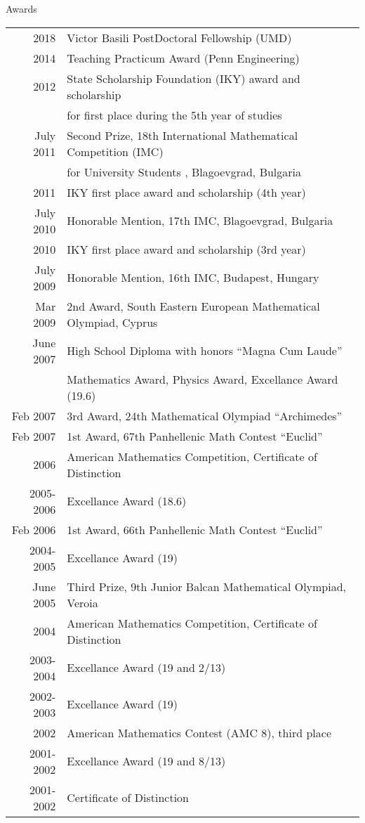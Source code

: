 \documentclass{resume} %
\begin{document}

\begin{rSection}{Awards}

  \begin{longtable}{rl}
  2018 & Victor Basili PostDoctoral Fellowship (UMD)\\
  2014	 & Teaching Practicum Award (Penn Engineering) \\
  2012 & State Scholarship Foundation (IKY) award and scholarship \\
       & for first place during the 5th year of studies \\
  July  2011  &  Second  Prize,  18th  International Mathematical Competition (IMC) \\
  &  for University Students , Blagoevgrad, Bulgaria \\
  2011 & IKY first place award and scholarship (4th year)\\
  July 2010 &  Honorable Mention,  17th IMC, Blagoevgrad, Bulgaria \\
  2010 & IKY first place award and scholarship (3rd year)\\
  July 2009 &  Honorable Mention,  16th IMC, Budapest, Hungary\\
  Mar 2009  &  2nd Award, South Eastern European Mathematical Olympiad, Cyprus\\

  June  2007 &   High  School  Diploma with  honors  “Magna  Cum  Laude”\\
             &   Mathematics Award, Physics Award,  Excellance Award (19.6)\\
  Feb 2007 &  3rd Award, 24th Mathematical Olympiad “Archimedes”\\
  Feb 2007 &  1st Award, 67th Panhellenic Math Contest “Euclid”\\
  2006 &  American Mathematics Competition, Certificate of Distinction\\
  2005-2006 &  Excellance Award (18.6)\\
  Feb 2006 &  1st Award, 66th Panhellenic Math Contest “Euclid”\\
  2004-2005 &  Excellance Award (19)\\
  June 2005 &  Third Prize, 9th Junior Balcan Mathematical Olympiad, Veroia\\
  2004 &  American Mathematics Competition, Certificate of Distinction\\
  2003-2004&  Excellance Award (19 and 2/13)\\
  2002-2003&  Excellance Award (19)\\
  2002 & American Mathematics Contest (AMC 8), third place\\
  2001-2002&  Excellance Award (19 and 8/13)\\
  2001-2002&  Certificate of Distinction\\
  
\end{longtable}

\end{rSection}
\end{document}
